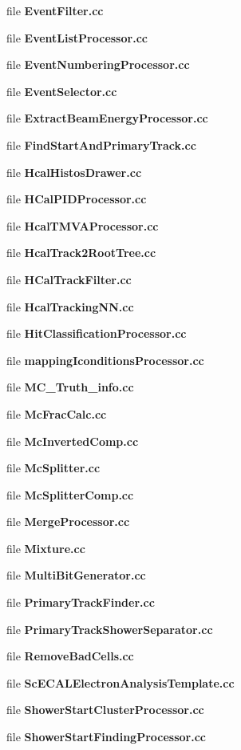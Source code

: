 \begin{DoxyCompactItemize}
file {\bfseries Event\-Filter.\-cc}
\item 
file {\bfseries Event\-List\-Processor.\-cc}
\item 
file {\bfseries Event\-Numbering\-Processor.\-cc}
\item 
file {\bfseries Event\-Selector.\-cc}
\item 
file {\bfseries Extract\-Beam\-Energy\-Processor.\-cc}
\item 
file {\bfseries Find\-Start\-And\-Primary\-Track.\-cc}
\item 
file {\bfseries Hcal\-Histos\-Drawer.\-cc}
\item 
file {\bfseries H\-Cal\-P\-I\-D\-Processor.\-cc}
\item 
file {\bfseries Hcal\-T\-M\-V\-A\-Processor.\-cc}
\item 
file {\bfseries Hcal\-Track2\-Root\-Tree.\-cc}
\item 
file {\bfseries H\-Cal\-Track\-Filter.\-cc}
\item 
file {\bfseries Hcal\-Tracking\-N\-N.\-cc}
\item 
file {\bfseries Hit\-Classification\-Processor.\-cc}
\item 
file {\bfseries mapping\-Iconditions\-Processor.\-cc}
\item 
file {\bfseries M\-C\-\_\-\-Truth\-\_\-info.\-cc}
\item 
file {\bfseries Mc\-Frac\-Calc.\-cc}
\item 
file {\bfseries Mc\-Inverted\-Comp.\-cc}
\item 
file {\bfseries Mc\-Splitter.\-cc}
\item 
file {\bfseries Mc\-Splitter\-Comp.\-cc}
\item 
file {\bfseries Merge\-Processor.\-cc}
\item 
file {\bfseries Mixture.\-cc}
\item 
file {\bfseries Multi\-Bit\-Generator.\-cc}
\item 
file {\bfseries Primary\-Track\-Finder.\-cc}
\item 
file {\bfseries Primary\-Track\-Shower\-Separator.\-cc}
\item 
file {\bfseries Remove\-Bad\-Cells.\-cc}
\item 
file {\bfseries Sc\-E\-C\-A\-L\-Electron\-Analysis\-Template.\-cc}
\item 
file {\bfseries Shower\-Start\-Cluster\-Processor.\-cc}
\item 
file {\bfseries Shower\-Start\-Finding\-Processor.\-cc}
\item 

\end{DoxyCompactItemize}
